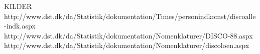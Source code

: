 

KILDER
http://www.dst.dk/da/Statistik/dokumentation/Times/personindkomst/discoalle-indk.aspx
http://www.dst.dk/da/Statistik/dokumentation/Nomenklaturer/DISCO-88.aspx
http://www.dst.dk/da/Statistik/dokumentation/Nomenklaturer/discoloen.aspx



